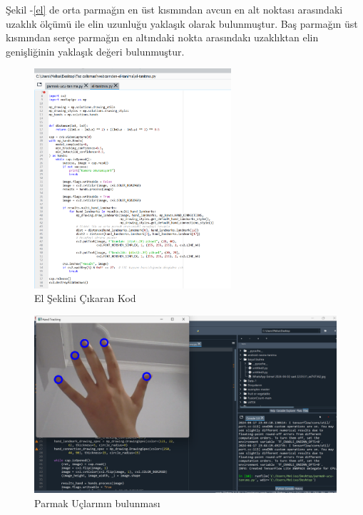 \documentclass[11pt,a4paper]{report}
\begin{document}
	Şekil -\ref{el} de orta parmağın en üst kısmından avcun en alt noktası arasındaki uzaklık ölçümü ile elin uzunluğu yaklaşık olarak bulunmuştur. Baş parmağın üst kısmından serçe parmağın en altındaki nokta arasındakı uzaklıktan elin genişliğinin yaklaşık değeri bulunmuştur.
	
	\begin{figure}[!h]
		\centering
		\includegraphics[width=0.65\textwidth]{el boyut kod2}
		\caption{El Şeklini Çıkaran Kod}
	\end{figure}
	
	\begin{figure}[!h]
		\centering
		\includegraphics[width=\textwidth]{tırnak}
		\caption{Parmak Uçlarının bulunması}
		\label{tırnak}
	\end{figure}
	
\end{document}
